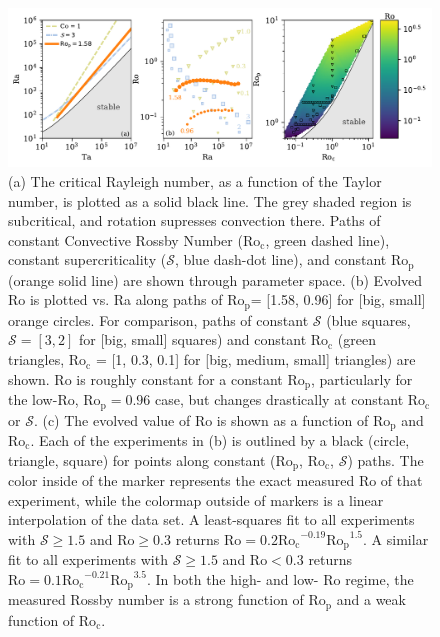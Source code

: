 \documentclass[twocolumn, amsmath, amsfonts, amssymb]{aastex62}
\newcommand{\pro}{\ensuremath{\text{Ro}_{\text{p}}}}
\newcommand{\con}{\ensuremath{\text{Ro}_{\text{c}}}}
\begin{document}
\begin{figure}[t!]
    \includegraphics[width=\textwidth]{parameter_space.pdf}
    \caption{(a) The critical Rayleigh number, as a function of the Taylor number, 
    is plotted as a solid black line. The grey shaded region is subcritical, and rotation
    supresses convection there. Paths of constant Convective Rossby Number
    ($\con$, green dashed line), constant supercriticality ($\mathcal{S}$, blue dash-dot line), and 
    constant \pro$\,$(orange solid line) are shown through parameter space. 
    (b) Evolved Ro is plotted vs. Ra along paths of \pro = [1.58, 0.96] for [big, small] orange circles.
    For comparison, paths of constant $\mathcal{S}$ (blue squares, $\mathcal{S} = [3,2]$ 
    for [big, small] squares)
    and constant $\con$ (green triangles, $\con$ = [1, 0.3, 0.1] for [big, medium, small] triangles) are shown.
    Ro is roughly constant for a constant \pro, particularly for the low-Ro, $\pro=0.96$ case, 
    but changes drastically at constant $\con$ or $\mathcal{S}$.
    (c) The evolved value of Ro is shown as a function of $\pro$ and $\con$. 
	Each of the experiments in (b) is outlined by a black (circle, triangle, square)
	for points along constant (\pro, \con, $\mathcal{S}$) paths.
	The color inside of the marker represents the exact measured Ro of that experiment, 
	while the colormap outside of markers is a linear interpolation
	of the data set. A least-squares fit to all experiments with $\mathcal{S} \geq 1.5$ and
	$\text{Ro} \geq 0.3$ returns $\text{Ro} = 0.2 \con^{-0.19}\pro^{1.5}$. A similar fit to all experiments with
	$\mathcal{S} \geq 1.5$ and $\text{Ro} < 0.3$ returns $\text{Ro} = 0.1 \con^{-0.21}\pro^{3.5}$. 
	In both the high- and low- Ro regime, the measured
	Rossby number is a strong function of $\pro$ and a weak function of $\con$.
    \label{fig:parameter_space} }
\end{figure}
\end{document}
